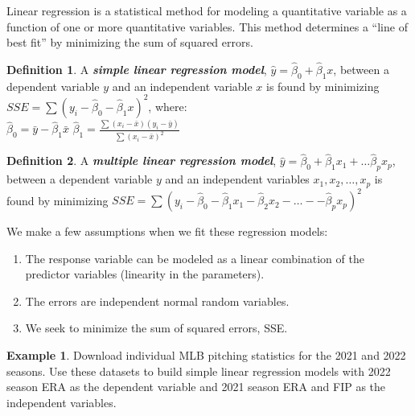 \documentclass[
  11pt,
]{book}
\providecommand{\tightlist}{%
  \setlength{\itemsep}{0pt}\setlength{\parskip}{0pt}}
\theoremstyle{definition}
\newtheorem{definition}{Definition}[chapter]
\theoremstyle{definition}
\newtheorem{example}{Example}[chapter]
\theoremstyle{definition}
\theoremstyle{definition}
\theoremstyle{remark}
\begin{document}
Linear regression is a statistical method for modeling a quantitative variable as a function of one or more quantitative variables. This method determines a ``line of best fit'' by minimizing the sum of squared errors.

\begin{definition}
A \textbf{\emph{simple linear regression model}}, \(\hat{y} = \hat{\beta}_0 + \hat{\beta}_1 x\), between a dependent variable \(y\) and an independent variable \(x\) is found by minimizing \(SSE=\sum(y_i-\hat{\beta}_0-\hat{\beta}_1x)^2\), where:\\

\(\hat{\beta}_0 = \bar{y} - \hat{\beta}_1 \bar{x}\) \hspace{0.1in} \(\hat{\beta}_1 = \frac{\sum(x_i-\bar{x})(y_i-\bar{y})}{\sum(x_i-\bar{x})^2}\)\\

\end{definition}

\begin{definition}
A \textbf{\emph{multiple linear regression model}}, \(\hat{y} = \hat{\beta}_0 + \hat{\beta}_1 x_1 + \ldots \hat{\beta}_p x_p\), between a dependent variable \(y\) and an independent variables \(x_1, x_2, \ldots, x_p\) is found by minimizing \(SSE=\sum(y_i-\hat{\beta}_0-\hat{\beta}_1x_1-\hat{\beta}_2x_2- \ldots - -\hat{\beta}_px_p)^2\)\\

\end{definition}

We make a few assumptions when we fit these regression models:

\begin{enumerate}
\def\labelenumi{\arabic{enumi}.}
\tightlist
\item
  The response variable can be modeled as a linear combination of the predictor variables (linearity in the parameters).\\
\item
  The errors are independent normal random variables.\\
\item
  We seek to minimize the sum of squared errors, SSE.
\end{enumerate}

\newpage

\begin{example}
Download individual MLB pitching statistics for the 2021 and 2022 seasons. Use these datasets to build simple linear regression models with 2022 season ERA as the dependent variable and 2021 season ERA and FIP as the independent variables.
\end{example}
\end{document}
